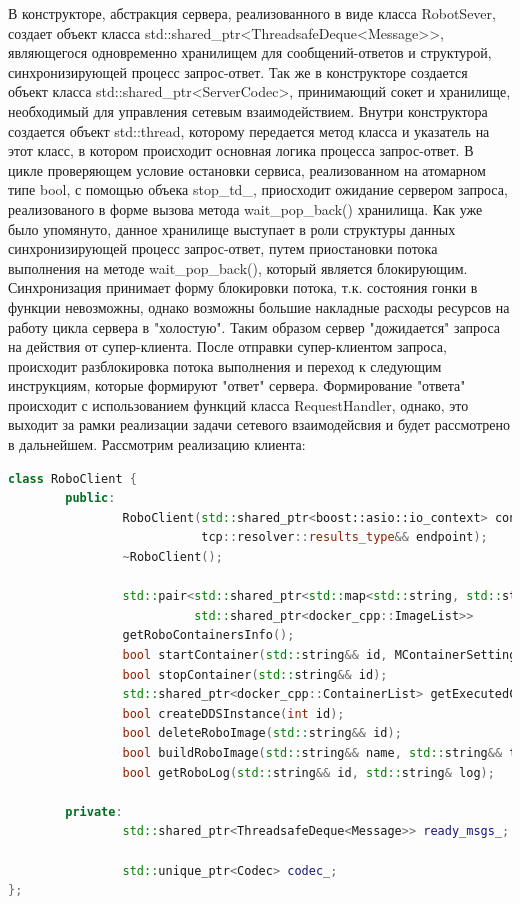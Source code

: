 \documentclass[a4paper, 14pt]{extreport}
\begin{document}
\par В конструкторе, абстракция сервера, реализованного в виде класса RobotSever, создает объект класса std::shared\_ptr<ThreadsafeDeque<Message>>,
являющегося одновременно хранилищем
для сообщений-ответов и структурой, синхронизирующей процесс запрос-ответ. Так же в конструкторе создается объект класса 
std::shared\_ptr<ServerCodec>, принимающий сокет и хранилище, необходимый для управления сетевым взаимодействием. Внутри конструктора 
создается объект std::thread, которому передается метод класса и указатель на этот класс, в котором происходит основная логика процесса 
запрос-ответ. В цикле проверяющем условие остановки сервиса, реализованном на атомарном типе bool, с помощью объека stop\_td\_, приосходит 
ожидание сервером запроса, реализованого в форме вызова метода wait\_pop\_back() хранилища. Как уже было упомянуто, данное хранилище 
выступает в роли структуры данных синхронизирующей процесс запрос-ответ, путем приостановки потока выполнения на методе wait\_pop\_back(),
который является блокирующим. Синхронизация принимает форму блокировки потока, т.к. состояния гонки в функции невозможны, однако возможны
большие накладные расходы ресурсов на работу цикла сервера в "холостую". Таким образом сервер "дожидается" запроса на действия от
супер-клиента. После отправки супер-клиентом запроса,
происходит разблокировка потока выполнения и переход к следующим инструкциям, которые формируют "ответ" сервера. Формирование "ответа" 
происходит с использованием функций класса RequestHandler, однако, это выходит за рамки реализации задачи сетевого взаимодейсвия и будет 
рассмотрено в дальнейшем. Рассмотрим реализацию клиента:
\begin{lstlisting}[language=C++, frame=single, xleftmargin=15pt, caption={Заголовочный файл класса RoboClient},label=DescriptiveLabel]
class RoboClient {
        public:
                RoboClient(std::shared_ptr<boost::asio::io_context> context,
                           tcp::resolver::results_type&& endpoint);
                ~RoboClient();
        
                std::pair<std::shared_ptr<std::map<std::string, std::string>>,
                          std::shared_ptr<docker_cpp::ImageList>>
                getRoboContainersInfo();
                bool startContainer(std::string&& id, MContainerSetting settings);
                bool stopContainer(std::string&& id);
                std::shared_ptr<docker_cpp::ContainerList> getExecutedContainers();
                bool createDDSInstance(int id);
                bool deleteRoboImage(std::string&& id);
                bool buildRoboImage(std::string&& name, std::string&& target, std::string&& username);
                bool getRoboLog(std::string&& id, std::string& log);
        
        private:
                std::shared_ptr<ThreadsafeDeque<Message>> ready_msgs_;
        
                std::unique_ptr<Codec> codec_;
};
\end{lstlisting}
\end{document}
